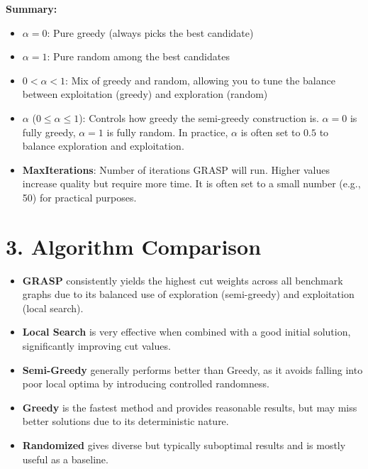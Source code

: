 \documentclass[11pt]{article}
\begin{document}
\textbf{Summary:}
\begin{itemize}
\item $\alpha = 0$: Pure greedy (always picks the best candidate)
\item $\alpha = 1$: Pure random among the best candidates
\item $0 < \alpha < 1$: Mix of greedy and random, allowing you to tune the balance between exploitation (greedy) and exploration (random)
\item \textbf{\(\alpha\)} (\(0 \leq \alpha \leq 1\)): Controls how greedy the semi-greedy construction is. \textit{\(\alpha = 0\)} is fully greedy, \textit{\(\alpha = 1\)} is fully random. In practice, \(\alpha\) is often set to \(0.5\) to balance exploration and exploitation.
\item \textbf{MaxIterations}: Number of iterations GRASP will run. Higher values increase quality but require more time. It is often set to a small number (e.g., 50) for practical purposes.
\end{itemize}

\section*{3. Algorithm Comparison}

\begin{itemize}
    \item \textbf{GRASP} consistently yields the highest cut weights across all benchmark graphs due to its balanced use of exploration (semi-greedy) and exploitation (local search).
    \item \textbf{Local Search} is very effective when combined with a good initial solution, significantly improving cut values.
    \item \textbf{Semi-Greedy} generally performs better than Greedy, as it avoids falling into poor local optima by introducing controlled randomness.
    \item \textbf{Greedy} is the fastest method and provides reasonable results, but may miss better solutions due to its deterministic nature.
    \item \textbf{Randomized} gives diverse but typically suboptimal results and is mostly useful as a baseline.
\end{itemize}
\end{document}
